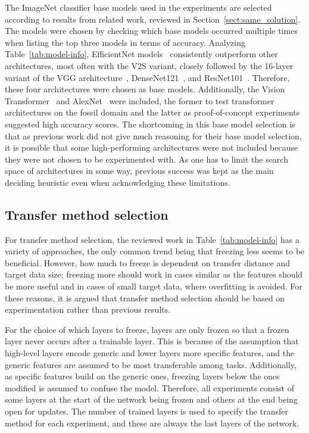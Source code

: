 \documentclass[english,twoside,openright]{UH_DS_MSc}
\begin{document}
The ImageNet classifier base models used in the experiments are selected 
according to results from related work, reviewed in Section~\ref{sect:same_solution}.
The models were chosen by checking which base models 
occurred multiple times when listing the top three models in terms of accuracy. 
Analyzing Table~\ref{tab:model-info}, EfficientNet models~\cite{efficientnetv2} consistently outperform 
other architectures, most often with the V2S variant, closely followed by the 16-layer variant of the VGG architecture~\cite{vgg},
DenseNet121~\cite{densenet}, and ResNet101~\cite{resnet}.
Therefore, these four architectures were chosen as base models.
Additionally, the Vision Transformer~\cite{vit} and AlexNet~\cite{alexnet} were included, the former to test 
transformer architectures on the fossil domain and the latter
as proof-of-concept experiments suggested high accuracy scores.
The shortcoming in this base model selection is that as previous work did not give much
 reasoning for their base model selection, it is possible that some high-performing architectures were not included 
because they were not chosen to be experimented with. As one has to limit the 
search space of architectures in some way, previous success was kept as the main deciding heuristic 
even when acknowledging these limitations.

\subsection{Transfer method selection}

For transfer method selection, the reviewed work in Table~\ref{tab:model-info} has a variety of approaches, 
the only common trend being that freezing less seems to be beneficial. 
However, how much to freeze is dependent on transfer distance and target data size;
freezing more should work in cases similar as the features should be more useful 
and in cases of small target data, where overfitting is avoided.
For these reasons, it is argued that transfer method selection should be
based on experimentation rather than previous results.

For the choice of which layers to freeze, layers are only frozen so that a frozen layer never 
occurs after a trainable layer. This is because of the assumption that high-level layers 
encode generic and lower layers more specific features, and the generic features are assumed to be most transferable among tasks.
 Additionally, as specific features build on the generic ones, freezing layers 
below the ones modified is assumed to confuse the model. Therefore, all experiments consist of some layers 
at the start of the network being frozen and others at the end being open for updates.
The number of trained layers is used to specify the transfer method 
for each experiment, and these are always the last layers of the network.
\end{document}
